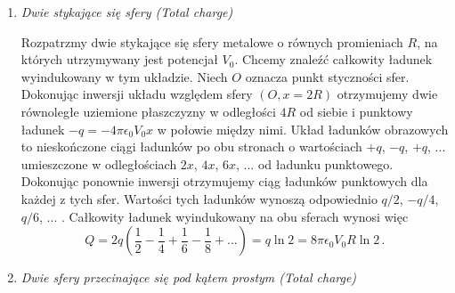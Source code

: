 \documentclass[../main.tex]{subfiles}
\begin{document}
\begin{enumerate}
     \item \textit{Dwie stykające się sfery (Total charge)}
     \medskip
     
     Rozpatrzmy dwie stykające się sfery metalowe o równych promieniach \(R\), na których
     utrzymywany jest potencjał \(V_0\). Chcemy znaleźć całkowity ładunek wyindukowany w tym
     układzie. Niech \(O\) oznacza punkt styczności sfer. Dokonując inwersji układu względem sfery
     \((O,x=2R)\) otrzymujemy dwie równoległe uziemione płaszczyzny w odległości \(4R\) od siebie i
     punktowy ładunek \(-q=-4\pi\epsilon_0V_0x\) w połowie między nimi. Układ ładunków obrazowych to
     nieskończone ciągi ładunków po obu stronach o wartościach \(+q\), \(-q\), \(+q\), ...
     umieszczone w odległościach \(2x\), \(4x\), \(6x\), ... od ładunku punktowego. Dokonując
     ponownie inwersji otrzymujemy ciąg ładunków punktowych dla każdej z tych sfer. Wartości tych
     ładunków wynoszą odpowiednio \(q/2\), \(-q/4\), \(q/6\), ... . Całkowity ładunek wyindukowany
     na obu sferach wynosi więc
     \begin{equation*}
         Q=2q\left(\frac{1}{2}-\frac{1}{4}+\frac{1}{6}-\frac{1}{8}+...\right)=q\ln 2=8\pi\epsilon_0 V_0R\ln 2\,.
     \end{equation*}
    
    \item \textit{Dwie sfery przecinające się pod kątem prostym (Total charge)}
    \medskip
    

\end{enumerate}
\end{document}
